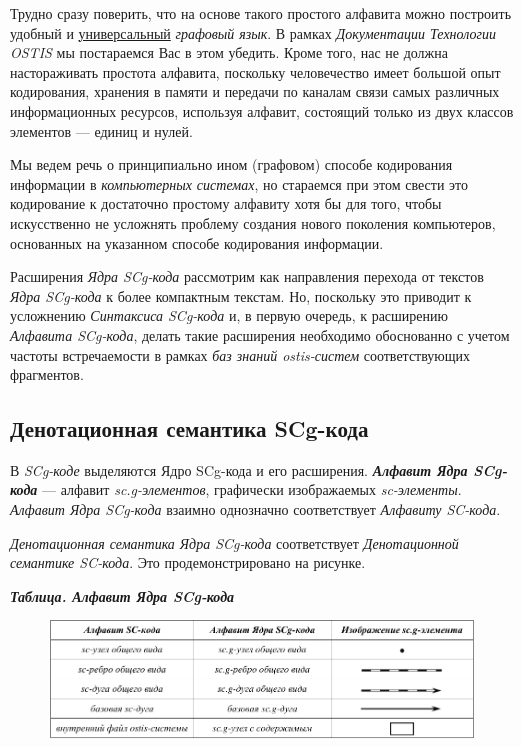 \bigskip
Трудно сразу поверить, что на основе такого простого алфавита можно построить удобный и \uline{универсальный} \textit{графовый язык}. В рамках \textit{Документации Технологии OSTIS} мы постараемся Вас в этом убедить. Кроме того, нас не должна настораживать простота алфавита, поскольку человечество имеет большой опыт кодирования, хранения в памяти и передачи по каналам связи самых различных информационных ресурсов, используя алфавит, состоящий только из двух классов элементов --- единиц и нулей. 

Мы ведем речь о принципиально ином (графовом) способе кодирования информации в \textit{компьютерных системах}, но стараемся при этом свести это кодирование к достаточно простому алфавиту хотя бы для того, чтобы искусственно не усложнять проблему создания нового поколения компьютеров, основанных на указанном способе кодирования информации. 

Расширения \textit{Ядра SCg-кода} рассмотрим как направления перехода от текстов \textit{Ядра SCg-кода} к более компактным текстам. Но, поскольку это приводит к усложнению \textit{Синтаксиса SCg-кода} и, в первую очередь, к расширению \textit{Алфавита SCg-кода\scnsupergroupsign}, делать такие расширения необходимо обоснованно с учетом частоты встречаемости в рамках \textit{баз знаний ostis-систем} соответствующих фрагментов.

\subsection{Денотационная семантика SCg-кода}
\label{sec_scg_semantics}

В \textit{SCg-коде} выделяются Ядро SCg-кода и его расширения. 
\textbf{\textit{Алфавит Ядра SCg-кода\scnsupergroupsign}} --- алфавит \textit{sc.g-элементов}, графически изображаемых \textit{sc-элементы}. \textit{Алфавит Ядра SCg-кода\scnsupergroupsign} взаимно однозначно соответствует \textit{Алфавиту SC-кода\scnsupergroupsign}.

\textit{Денотационная семантика Ядра SCg-кода} соответствует \textit{Денотационной семантике SC-кода}. Это продемонстрировано на рисунке.

\textbf{\textit{Таблица. Алфавит Ядра SCg-кода\scnsupergroupsign}}
\begin{figure}[h]
	\centering
	\includegraphics[scale=0.8]{images/intro/scg/SCg-core-alphabet.pdf}
\end{figure}

